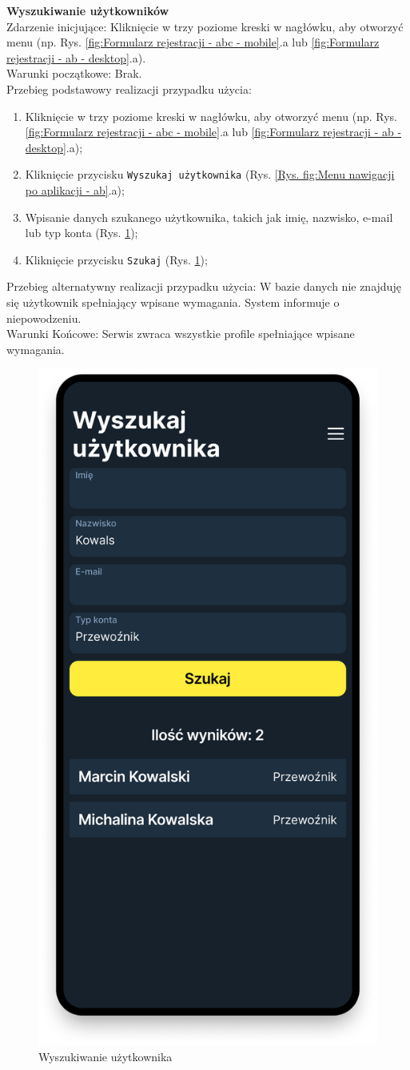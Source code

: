 \textbf{Wyszukiwanie użytkowników} \\
Zdarzenie inicjujące: Kliknięcie w trzy poziome kreski w nagłówku, aby otworzyć menu (np. Rys. \ref{fig:Formularz rejestracji - abc - mobile}.a lub \ref{fig:Formularz rejestracji - ab - desktop}.a). \\
Warunki początkowe: Brak. \\
Przebieg podstawowy realizacji przypadku użycia:
\begin{enumerate}
    \item Kliknięcie w trzy poziome kreski w nagłówku, aby otworzyć menu (np. Rys. \ref{fig:Formularz rejestracji - abc - mobile}.a lub \ref{fig:Formularz rejestracji - ab - desktop}.a);
    \item Kliknięcie przycisku \texttt{Wyszukaj użytkownika} (Rys. \ref{Rys. fig:Menu nawigacji po aplikacji - ab}.a);
    \item Wpisanie danych szukanego użytkownika, takich jak imię, nazwisko, e-mail lub typ konta (Rys. \ref{Rys. fig:Wyszukiwanie użytkownika});
    \item Kliknięcie przycisku \texttt{Szukaj} (Rys. \ref{Rys. fig:Wyszukiwanie użytkownika});
\end{enumerate}
Przebieg alternatywny realizacji przypadku użycia: W bazie danych nie znajduję się użytkownik spełniający wpisane wymagania. System informuje o niepowodzeniu. \\
Warunki Końcowe: Serwis zwraca wszystkie profile spełniające wpisane wymagania.\\
\begin{figure}[H]
	\centering
		\includegraphics[width=0.3\linewidth]{rozdzial1/szukaj_uzytkownika.png}
	\caption{Wyszukiwanie użytkownika}
	\label{Rys. fig:Wyszukiwanie użytkownika}
\end{figure}
\label{Przeglądanie zleceń}

